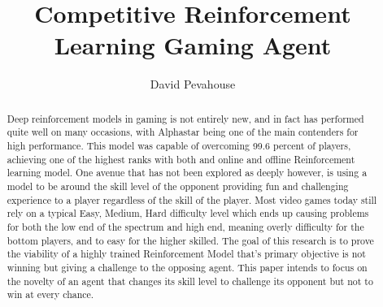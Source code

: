 \documentclass[a4paper, 11pt]{article}
\title{Competitive Reinforcement Learning Gaming Agent}
\author{David Pevahouse}
\begin{document}

\newpage
\maketitle
\begin{abstract}
    Deep reinforcement models in gaming is not entirely new, and in fact has performed quite well on many occasions, with Alphastar being one of the main contenders for high performance\cite{starcraft_unplugged}. This model was capable of overcoming
    99.6 percent of players, achieving one of the highest ranks with both and online and offline Reinforcement learning model. One avenue that has not been explored as deeply however, is using a model to be around the skill level of the opponent providing
    fun and challenging experience to a player regardless of the skill of the player. Most video games today still rely on a typical Easy, Medium, Hard difficulty level which ends up causing problems for both the low end of the spectrum and high end, meaning
    overly difficulty for the bottom players, and to easy for the higher skilled. The goal of this research is to prove the viability of a highly trained Reinforcement Model that's primary objective is not winning but giving a challenge to the opposing agent. This
    paper intends to focus on the novelty of an agent that changes its skill level to challenge its opponent but not to win at every chance.
\end{abstract}
\setcounter{page}{1}

\hypersetup{linkcolor=blue}







\newpage

\newpage

\titleformat{\section}{\normalfont\huge\bfseries}{\thesection}{1em}{} 
\newpage


\newpage

\appendix
\setcounter{page}{1} %


\end{document}
